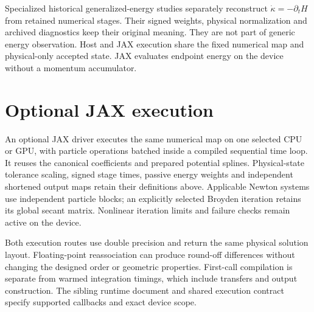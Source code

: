\documentclass[11pt,a4paper]{article}
\begin{document}
Specialized historical generalized-energy studies separately reconstruct
$\dot\kappa=-\partial_tH$ from retained numerical stages. Their signed weights,
physical normalization and archived diagnostics keep their original meaning.
They are not part of generic energy observation. Host and JAX execution share
the fixed numerical map and physical-only accepted state. JAX evaluates endpoint
energy on the device without a momentum accumulator.

\section{Optional JAX execution}

An optional JAX driver executes the same numerical map on one selected CPU
or GPU, with particle operations batched inside a compiled sequential time
loop. It reuses the canonical coefficients and prepared potential splines.
Physical-state tolerance scaling, signed stage times, passive energy weights
and independent shortened output maps retain their definitions above.
Applicable Newton systems use independent particle blocks; an explicitly
selected Broyden iteration retains its global secant matrix. Nonlinear
iteration limits and failure checks remain active on the device.

Both execution routes use double precision and return the same physical
solution layout. Floating-point reassociation can produce round-off
differences without changing the designed order or geometric properties.
First-call compilation is separate from warmed integration timings, which
include transfers and output construction. The sibling runtime document and
shared execution contract specify supported callbacks and exact device scope.
\end{document}
